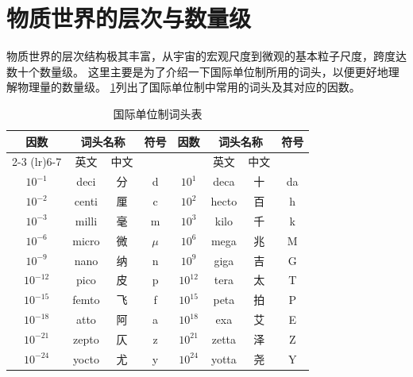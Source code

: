 \section{物质世界的层次与数量级}\label{sec:scales-of-matter}

物质世界的层次结构极其丰富，从宇宙的宏观尺度到微观的基本粒子尺度，跨度达数十个数量级。
这里主要是为了介绍一下国际单位制所用的词头，以便更好地理解物理量的数量级。
\cref{tab:si-prefixes}列出了国际单位制中常用的词头及其对应的因数。
\begin{table}[htbp]
    \centering
    \caption{国际单位制词头表}
    \begin{tabular}{cccc|cccc}
        \toprule
        \multirow{2}{*}{因数} & \multicolumn{2}{c}{词头名称} & 符号 & \multirow{2}{*}{因数} & \multicolumn{2}{c}{词头名称} & 符号              \\
        \cmidrule(lr){2-3} \cmidrule(lr){6-7}
                            & 英文                       & 中文 &                     &                          & 英文    & 中文 &    \\
        \midrule
        $10^{-1}$           & deci                     & 分  & d                   & $10^{1}$                 & deca  & 十  & da \\
        $10^{-2}$           & centi                    & 厘  & c                   & $10^{2}$                 & hecto & 百  & h  \\
        $10^{-3}$           & milli                    & 毫  & m                   & $10^{3}$                 & kilo  & 千  & k  \\
        $10^{-6}$           & micro                    & 微  & $\mu$               & $10^{6}$                 & mega  & 兆  & M  \\
        $10^{-9}$           & nano                     & 纳  & n                   & $10^{9}$                 & giga  & 吉  & G  \\
        $10^{-12}$          & pico                     & 皮  & p                   & $10^{12}$                & tera  & 太  & T  \\
        $10^{-15}$          & femto                    & 飞  & f                   & $10^{15}$                & peta  & 拍  & P  \\
        $10^{-18}$          & atto                     & 阿  & a                   & $10^{18}$                & exa   & 艾  & E  \\
        $10^{-21}$          & zepto                    & 仄  & z                   & $10^{21}$                & zetta & 泽  & Z  \\
        $10^{-24}$          & yocto                    & 尤  & y                   & $10^{24}$                & yotta & 尧  & Y  \\
        \bottomrule
    \end{tabular}
    \label{tab:si-prefixes}
\end{table}

